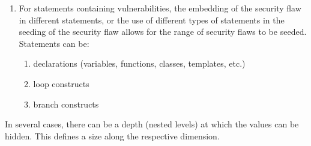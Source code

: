 \begin{enumerate}
\begin{enumerate}
            \item For statements containing vulnerabilities, the embedding of 
                  the security flaw in different statements, or the use of different
                  types of statements in the seeding of the security flaw allows
                  for the range of security flaws to be seeded. Statements 
                  can be:
               \begin{enumerate}
                  \item declarations (variables, functions, classes, templates, etc.)
                  \item loop constructs
                  \item branch constructs
               \end{enumerate}

         \end{enumerate}
         In several cases, there can be a depth (nested levels) at which the 
         values can be hidden.  This defines a size along the respective
         dimension.

\end{enumerate}

